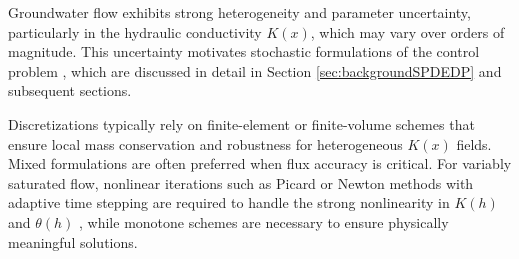 \documentclass{article}
\newcommand{\1}{\mathds{1}}          %
\theoremstyle{definition}
\begin{document}
\begin{sloppypar}
Groundwater flow exhibits strong heterogeneity and parameter uncertainty, particularly in the hydraulic conductivity $K(x)$, which may vary over orders of magnitude. This uncertainty motivates stochastic formulations of the control problem \cite{carrera2005}, which are discussed in detail in Section \ref{sec:backgroundSPDEDP} and subsequent sections.



Discretizations typically rely on finite-element or finite-volume schemes that ensure local mass conservation and robustness for heterogeneous $K(x)$ fields. Mixed formulations are often preferred when flux accuracy is critical. For variably saturated flow, nonlinear iterations such as Picard or Newton methods with adaptive time stepping are required to handle the strong nonlinearity in $K(h)$ and $\theta(h)$ \cite{celia1990,delaunay2017}, while monotone schemes are necessary to ensure physically meaningful solutions.



\end{sloppypar}
\end{document}
